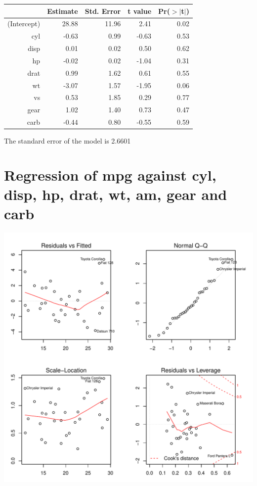 \documentclass{article}\usepackage[]{graphicx}\usepackage[]{color}
\makeatletter
\def\maxwidth{ %
  \ifdim\Gin@nat@width>\linewidth
    \linewidth
  \else
    \Gin@nat@width
  \fi
}
\newenvironment{knitrout}{}{} %
\makeatother
\begin{document}
\begin{table}[ht]
\centering
\begin{tabular}{rrrrr}
  \hline
 & Estimate & Std. Error & t value & Pr($>$$|$t$|$) \\ 
  \hline
(Intercept) & 28.88 & 11.96 & 2.41 & 0.02 \\ 
  cyl & -0.63 & 0.99 & -0.63 & 0.53 \\ 
  disp & 0.01 & 0.02 & 0.50 & 0.62 \\ 
  hp & -0.02 & 0.02 & -1.04 & 0.31 \\ 
  drat & 0.99 & 1.62 & 0.61 & 0.55 \\ 
  wt & -3.07 & 1.57 & -1.95 & 0.06 \\ 
  vs & 0.53 & 1.85 & 0.29 & 0.77 \\ 
  gear & 1.02 & 1.40 & 0.73 & 0.47 \\ 
  carb & -0.44 & 0.80 & -0.55 & 0.59 \\ 
   \hline
\end{tabular}
\end{table}




The standard error of the model is 2.6601

\newpage

\section{Regression of mpg against cyl, disp, hp, drat, wt, am, gear and carb }
\begin{knitrout}
\color{fgcolor}

{\centering \includegraphics[width=\maxwidth]{figure/lm-cyl-disp-hp-drat-wt-am-gear-carb} 

}



\end{knitrout}
\end{document}
